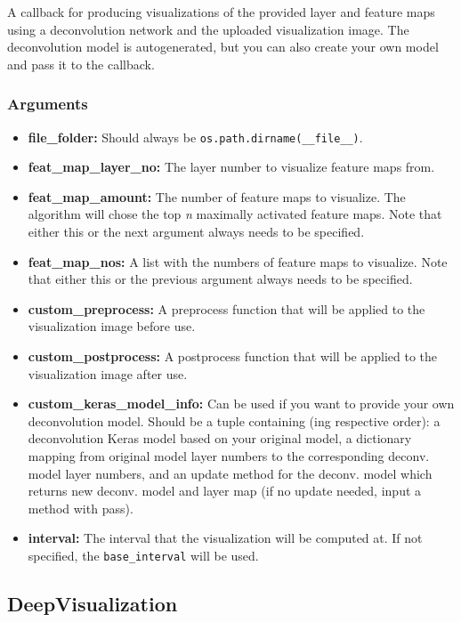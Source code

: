 \noindent A callback for producing visualizations of the provided layer and feature maps using a deconvolution network and the uploaded visualization image. The deconvolution model is autogenerated, but you can also create your own model and pass it to the callback.

\subsubsection*{Arguments}

\begin{itemize}
    \item \textbf{file\_folder:} Should always be \texttt{os.path.dirname(\_\_file\_\_)}.
    \item \textbf{feat\_map\_layer\_no:} The layer number to visualize feature maps from.
    \item \textbf{feat\_map\_amount:} The number of feature maps to visualize. The algorithm will chose the top \textit{n} maximally activated feature maps. Note that either this or the next argument always needs to be specified.
    \item \textbf{feat\_map\_nos:} A list with the numbers of feature maps to visualize. Note that either this or the previous argument always needs to be specified.
    \item \textbf{custom\_preprocess:} A preprocess function that will be applied to the visualization image before use.
    \item \textbf{custom\_postprocess:} A postprocess function that will be applied to the visualization image after use.
    \item \textbf{custom\_keras\_model\_info:} Can be used if you want to provide your own deconvolution model. Should be a tuple containing (ing respective order): a deconvolution Keras model based on your original model, a dictionary mapping from original model layer numbers to the corresponding deconv. model layer numbers, and an update method for the deconv. model which returns new deconv. model and layer map (if no update needed, input a method with pass).
    \item \textbf{interval:} The interval that the visualization will be computed at. If not specified, the \texttt{base\_interval} will be used.
\end{itemize}

\subsection*{DeepVisualization}

